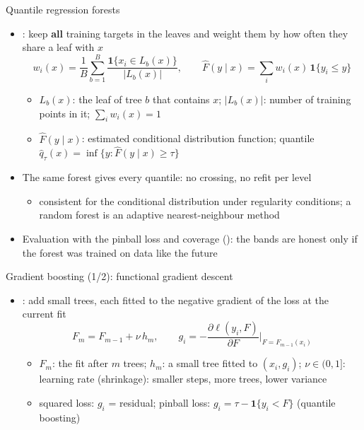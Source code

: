 \begin{frame}{Quantile regression forests}
\itemsize{\small}
\begin{itemize}
    \item {}: keep \textbf{all} training targets in the leaves and weight them by how often they share a leaf with $x$
    \[ w_i(x) = \frac1B\sum_{b=1}^B \frac{\mathbf 1\{x_i \in L_b(x)\}}{|L_b(x)|}, \qquad \hat F(y\mid x) = \sum_i w_i(x)\,\mathbf 1\{y_i \le y\} \]
    \begin{itemize}
        \item $L_b(x)$: the leaf of tree $b$ that contains $x$; $|L_b(x)|$: number of training points in it; $\sum_i w_i(x) = 1$
        \item $\hat F(y\mid x)$: estimated conditional distribution function; quantile $\hat q_\tau(x) = \inf\{y: \hat F(y\mid x) \ge \tau\}$
    \end{itemize}
    \item The same forest gives every quantile: no crossing, no refit per level
    \begin{itemize}
        \item consistent for the conditional distribution under regularity conditions; a random forest is an adaptive nearest-neighbour method
    \end{itemize}
    \item Evaluation with the pinball loss and coverage (): the bands are honest only if the forest was trained on data like the future
\end{itemize}
\end{frame}

\begin{frame}{Gradient boosting (1/2): functional gradient descent}
\itemsize{\small}
\begin{itemize}
    \item {}: add small trees, each fitted to the negative gradient of the loss at the current fit
    \[ F_m = F_{m-1} + \nu\,h_m, \qquad g_i = -\frac{\partial\ell(y_i, F)}{\partial F}\Big|_{F = F_{m-1}(x_i)} \]
    \begin{itemize}
        \item $F_m$: the fit after $m$ trees; $h_m$: a small tree fitted to $(x_i, g_i)$; $\nu \in (0, 1]$: learning rate (shrinkage): smaller steps, more trees, lower variance
        \item squared loss: $g_i$ = residual; pinball loss: $g_i = \tau - \mathbf 1\{y_i < F\}$ (quantile boosting)
    \end{itemize}
\end{itemize}
\end{frame}

